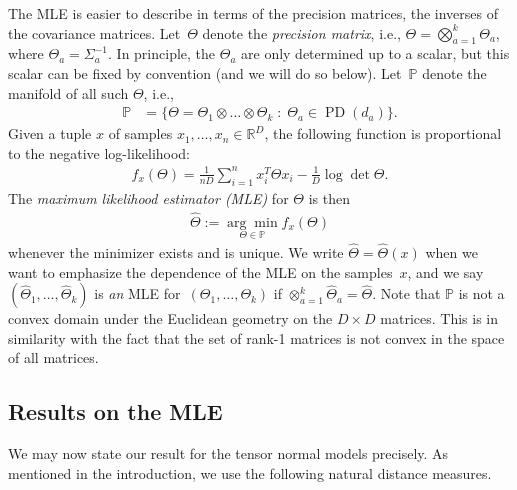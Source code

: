 \documentclass[aos]{imsart}
\theoremstyle{definition}
\numberwithin{equation}{section}
\DeclareMathOperator{\PD}{PD}
\newcommand{\R}{{\mathbb{R}}}
\renewcommand{\P}{{\mathbb{P}}}
\newcommand{\htheta}{\widehat{\Theta}}
\newcommand{\ot}{\otimes}
\newcommand{\samp}{x}
\newcommand{\ef}{f}
\newcommand{\MW}[1]{{\color{red}[MW: #1]}}
\newcommand{\MW}[1]{{}}
\begin{document}
The MLE is easier to describe in terms of the precision matrices, the inverses of the covariance matrices.
Let~$\Theta$ denote the \emph{precision matrix}, i.e., $\Theta = \bigotimes_{a=1}^k \Theta_a$, where $\Theta_a = \Sigma_a^{-1}$.
In principle, the $\Theta_a$ are only determined up to a scalar, but this scalar can be fixed by convention (and we will do so below).
Let~$\P$ denote the manifold of all such $\Theta$, i.e.,
\begin{align*}
  \P &= \bigl\{ \Theta = \Theta_1 \ot \dots \ot \Theta_k \;:\; \Theta_a \in \PD(d_a) \bigr\}.
 \end{align*}
Given a tuple $x$ of samples $\samp_1,\dots,\samp_n\in\R^D$, the following function is proportional to the negative log-likelihood: %
\begin{align}\label{eq:neg log likelihood}
  \ef_\samp(\Theta)
=  \frac{1}{nD}\sum_{i = 1}^n \samp_i^T \Theta \samp_i -  \frac{1}{D}\log\det\Theta.
\end{align}
The \emph{maximum likelihood estimator (MLE)} for $\Theta$ is then
\begin{align}\label{eq:mle}
  \widehat{\Theta} := \underset{\Theta \in \P}{ \arg\min} f_x(\Theta)
\end{align}
whenever the minimizer exists and is unique.
We write $\widehat\Theta = \widehat\Theta(x)$ when we want to emphasize the dependence of the MLE on the samples~$x$, and we say $(\htheta_1, \dots, \htheta_k)$ is \emph{an} MLE for~$(\Theta_1, \dots, \Theta_k)$ if $\otimes_{a = 1}^k \htheta_a = \htheta$.
Note that $\P$ is not a convex domain under the Euclidean geometry on the $D\times D$ matrices.
This is in similarity with the fact that the set of rank-1 matrices is not convex in the space of all matrices.

\subsection{Results on the MLE}
We may now state our result for the tensor normal models precisely.
As mentioned in the introduction, we use the following natural distance measures.
\end{document}
